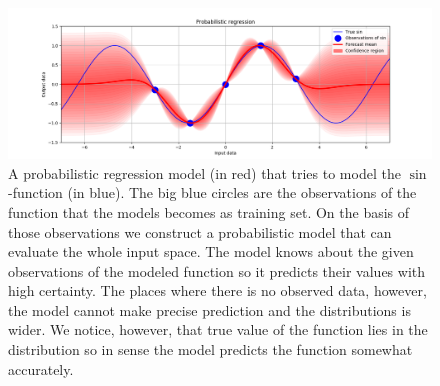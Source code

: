 \documentclass[12pt,a4paper,twoside]{scrartcl}
\numberwithin{equation}{section}
\begin{document}
\begin{center}
  \begin{figure}[H]
    \centering
    \includegraphics[height=0.5\textwidth, width=1\textwidth]{figures/probabilistic_regression.png}
    \caption[Probabilistic regression example model]{A probabilistic regression model (in red) that tries to model the \(\sin\)-function (in blue). The big blue circles are the observations of the function that the models becomes as training set. On the basis of those observations we construct a probabilistic model that can evaluate the whole input space. The model knows about the given observations of the modeled function so it predicts their values with high certainty. The places where there is no observed data, however, the model cannot make precise prediction and the distributions is wider. We notice, however, that true value of the function lies in the distribution so in sense the model predicts the function somewhat accurately.}\label{fig:prob-regression}
  \end{figure}
\end{center}
\end{document}
